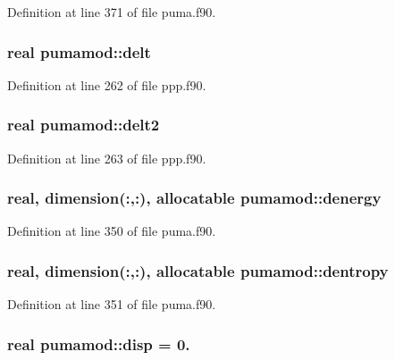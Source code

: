 \-Definition at line 371 of file puma.\-f90.

\hypertarget{classpumamod_a439717e747222ba51cf20b010f3e516c}{
\subsubsection[{delt}]{\setlength{\rightskip}{0pt plus 5cm}real {\bf pumamod\-::delt}}}
\label{classpumamod_a439717e747222ba51cf20b010f3e516c}


\-Definition at line 262 of file ppp.\-f90.

\hypertarget{classpumamod_a42f46b51b6a92eed14840e3c161d80a1}{
\subsubsection[{delt2}]{\setlength{\rightskip}{0pt plus 5cm}real {\bf pumamod\-::delt2}}}
\label{classpumamod_a42f46b51b6a92eed14840e3c161d80a1}


\-Definition at line 263 of file ppp.\-f90.

\hypertarget{classpumamod_aeea321b5684fff3240d0367b970bde23}{
\subsubsection[{denergy}]{\setlength{\rightskip}{0pt plus 5cm}real, dimension(\-:,\-:), allocatable {\bf pumamod\-::denergy}}}
\label{classpumamod_aeea321b5684fff3240d0367b970bde23}


\-Definition at line 350 of file puma.\-f90.

\hypertarget{classpumamod_a22d2a10d8b9f03d90130b1ccef2ec7c9}{
\subsubsection[{dentropy}]{\setlength{\rightskip}{0pt plus 5cm}real, dimension(\-:,\-:), allocatable {\bf pumamod\-::dentropy}}}
\label{classpumamod_a22d2a10d8b9f03d90130b1ccef2ec7c9}


\-Definition at line 351 of file puma.\-f90.

\hypertarget{classpumamod_a4fc16343d9407e3714e301309177a08a}{
\subsubsection[{disp}]{\setlength{\rightskip}{0pt plus 5cm}real {\bf pumamod\-::disp} = 0.}}
\label{classpumamod_a4fc16343d9407e3714e301309177a08a}


